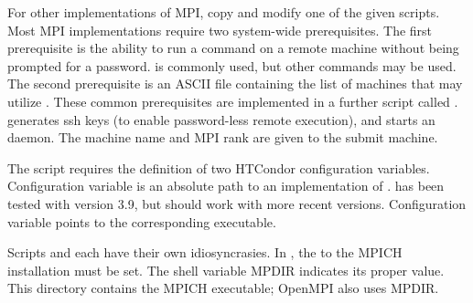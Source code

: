 For other implementations of MPI,
copy and modify one of the given scripts.
Most MPI implementations require two system-wide prerequisites.
The first prerequisite is the ability to run a command
on a remote machine without being prompted for a password.
 is commonly used, but other
commands may be used.
The second prerequisite is an ASCII file containing the
list of machines that may utilize .
These common prerequisites are implemented in a further script
called .
 generates ssh keys 
(to enable password-less remote execution),
and starts an  daemon.
The machine name and MPI rank are given to the submit machine.


The  script requires the definition of
two HTCondor configuration variables.
Configuration variable  is an absolute path to
an implementation of .
 has been tested with  version 3.9,
but should work with more recent versions.
Configuration variable  points
to the corresponding  executable.

Scripts  and 
each have their own idiosyncrasies.
In , the  to the MPICH installation must be set.
The shell variable MPDIR indicates its proper value.
This directory contains the MPICH  executable; OpenMPI also
uses MPDIR.


